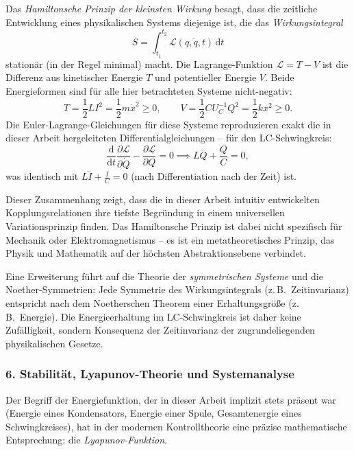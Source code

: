 ﻿\documentclass[12pt, a4paper]{article}
\begin{document}
	Das \textit{Hamiltonsche Prinzip der kleinsten Wirkung} besagt, dass die zeitliche Entwicklung eines physikalischen Systems diejenige ist, die das \textit{Wirkungsintegral}
	\begin{equation}
		S = \int_{t_1}^{t_2} \mathcal{L}(q, \dot{q}, t)\,\mathrm{d}t
	\end{equation}
	stationär (in der Regel minimal) macht. Die Lagrange-Funktion $\mathcal{L} = T - V$ ist die Differenz aus kinetischer Energie $T$ und potentieller Energie $V$. Beide Energieformen sind für alle hier betrachteten Systeme nicht-negativ:
	\begin{equation}
		T = \frac{1}{2}LI^2 = \frac{1}{2}m\dot{x}^2 \geq 0, \qquad V = \frac{1}{2}CU_C^{-1}Q^2 = \frac{1}{2}kx^2 \geq 0.
	\end{equation}
	Die Euler-Lagrange-Gleichungen für diese Systeme reproduzieren exakt die in dieser Arbeit hergeleiteten Differentialgleichungen -- für den LC-Schwingkreis:
	\begin{equation}
		\frac{\mathrm{d}}{\mathrm{d}t}\frac{\partial \mathcal{L}}{\partial \dot{Q}} - \frac{\partial \mathcal{L}}{\partial Q} = 0 \implies L\ddot{Q} + \frac{Q}{C} = 0,
	\end{equation}
	was identisch mit $L\ddot{I} + \frac{I}{C} = 0$ (nach Differentiation nach der Zeit) ist.

	Dieser Zusammenhang zeigt, dass die in dieser Arbeit intuitiv entwickelten Kopplungsrelationen ihre tiefste Begründung in einem universellen Variationsprinzip finden. Das Hamiltonsche Prinzip ist dabei nicht spezifisch für Mechanik oder Elektromagnetismus -- es ist ein metatheoretisches Prinzip, das Physik und Mathematik auf der höchsten Abstraktionsebene verbindet.

	Eine Erweiterung führt auf die Theorie der \textit{symmetrischen Systeme} und die Noether-Symmetrien: Jede Symmetrie des Wirkungsintegrals (z.\,B.\ Zeitinvarianz) entspricht nach dem Noetherschen Theorem einer Erhaltungsgröße (z.\,B.\ Energie). Die Energieerhaltung im LC-Schwingkreis ist daher keine Zufälligkeit, sondern Konsequenz der Zeitinvarianz der zugrundeliegenden physikalischen Gesetze.

	\subsubsection*{6. \quad Stabilität, Lyapunov-Theorie und Systemanalyse}

	Der Begriff der Energiefunktion, der in dieser Arbeit implizit stets präsent war (Energie eines Kondensators, Energie einer Spule, Gesamtenergie eines Schwingkreises), hat in der modernen Kontrolltheorie eine präzise mathematische Entsprechung: die \textit{Lyapunov-Funktion}.
\end{document}
